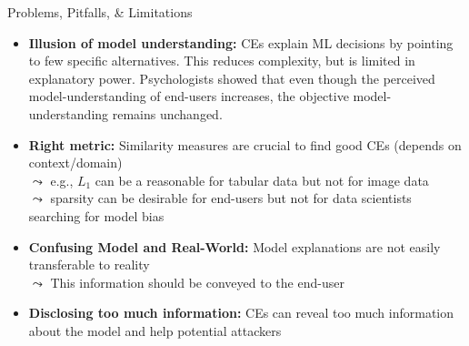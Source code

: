 \documentclass[11pt,compress,t,notes=noshow, aspectratio=169, xcolor=table]{beamer}
\begin{document}
\begin{frame}{Problems, Pitfalls, \& Limitations}
\begin{itemize}[<+->]
    \item \textbf{Illusion of model understanding:} 
    CEs explain ML decisions by pointing to few specific alternatives. This reduces complexity, but is limited in explanatory power. Psychologists showed that even though the perceived model-understanding of end-users increases, the objective model-understanding remains unchanged.
    
    \item \textbf{Right metric:} Similarity measures are crucial to find good CEs (depends on context/domain)\\
    $\leadsto$ e.g., $L_1$ can be a reasonable for tabular data but not for image data\\
    $\leadsto$ sparsity can be desirable for end-users but not for data scientists searching for model bias

    \item \textbf{Confusing Model and Real-World:} Model explanations are not easily transferable to reality\\
    $\leadsto$ This information should be conveyed to the end-user
    \item \textbf{Disclosing too much information:} CEs can reveal too much information about the model and help potential attackers
    \end{itemize}
\end{frame}
\end{document}
